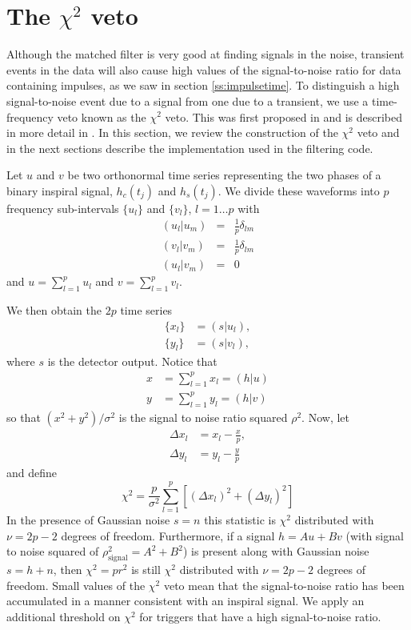 \section{The $\chi^2$ veto}
\label{s:chisqcts}

Although the matched filter is very good at finding signals in the noise,
transient events in the data will also cause high values of the
signal-to-noise ratio for data containing impulses, as we saw in section
\ref{ss:impulsetime}. To distinguish a high signal-to-noise event due to a
signal from one due to a transient, we use a time-frequency veto known as the
$\chi^2$ veto. This was first proposed in \cite{grasp} and is described in
more detail in \cite{Allen:2004}.  In this section, we review the construction
of the $\chi^2$ veto and in the next sections describe the implementation used
in the filtering code.

Let $u$ and $v$ be two orthonormal time series representing the two phases of a
binary inspiral signal, $h_c(t_j)$ and $h_s(t_j)$.  We divide these waveforms
into $p$ frequency sub-intervals $\{u_l\}$ and $\{v_l\}$, $l=1\ldots p$ with
\begin{eqnarray}
  (u_l|u_m) &=& \frac{1}{p}\delta_{lm} \\
  (v_l|v_m) &=& \frac{1}{p}\delta_{lm} \\
  (u_l|v_m) &=& 0
\end{eqnarray}
and $u=\sum_{l=1}^p u_l$ and $v=\sum_{l=1}^p v_l$.

We then obtain the $2p$ time series
\begin{align}
\{x_l\} & =(s|u_l),\\ 
\{y_l\} & =(s|v_l),
\end{align}
where $s$ is the detector output. Notice that 
\begin{align}
x &= \sum_{l=1}^p x_l=(h|u) \\
y &=\sum_{l=1}^p y_l=(h|v)
\end{align}
so that $(x^2+y^2)/ \sigma^2$ is the signal to noise ratio squared $\rho^2$.
Now, let 
\begin{align}
\Delta x_l &= x_l - \frac{x}{p}, \\
\Delta y_l &= y_l - \frac{y}{p}
\end{align}
and define
\begin{equation}
\chi^2 = \frac{p}{\sigma^2} \sum_{l=1}^p \left[ (\Delta x_l)^2 + (\Delta y_l)^2 \right]
\end{equation}
In the presence of Gaussian noise $s=n$ this statistic is $\chi^2$ distributed
with $\nu=2p-2$ degrees of freedom.  Furthermore, if a signal $h=Au+Bv$ (with signal
to noise squared of $\rho^2_{\mathrm{signal}}=A^2+B^2$) is present along with
Gaussian noise $s=h+n$, then $\chi^2=pr^2$ is still $\chi^2$ distributed
with $\nu=2p-2$ degrees of freedom. Small values of the $\chi^2$ veto mean
that the signal-to-noise ratio has been accumulated in a manner consistent
with an inspiral signal. We apply an additional threshold on $\chi^2$
for triggers that have a high signal-to-noise ratio.

